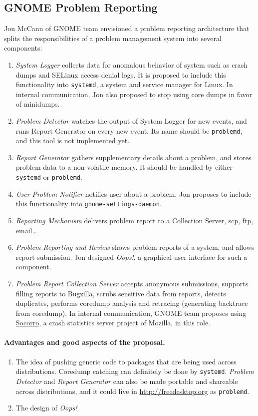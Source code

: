 \documentclass{article}
\begin{document}
\subsection{GNOME Problem Reporting}
Jon McCann of GNOME team envisioned a problem reporting
architecture\cite{JonProposal} that splits the responsibilities of a
problem management system into several components:
\begin{enumerate}
\item \emph{System Logger} collects data for anomalous behavior of
  system such as crash dumps and SELinux access denial logs.  It is
  proposed to include this functionality into \texttt{systemd}, a
  system and service manager for Linux.  In internal communication,
  Jon also proposed to stop using core dumps in favor of minidumps.
\item \emph{Problem Detector} watches the output of System Logger for
  new events, and runs Report Generator on every new event.  Its name
  should be \texttt{problemd}, and this tool is not implemented yet.
\item \emph{Report Generator} gathers supplementary details about a
  problem, and stores problem data to a non-volatile memory.  It
  should be handled by either \texttt{systemd} or \texttt{problemd}.
\item \emph{User Problem Notifier} notifies user about a problem.  Jon
  proposes to include this functionality into
  \texttt{gnome-settings-daemon}.
\item \emph{Reporting Mechanism} delivers problem report to a
  Collection Server, scp, ftp, email\ldots
\item \emph{Problem Reporting and Review} shows problem reports of a
  system, and allows report submission.  Jon designed
  \emph{Oops!}\cite{JonOops}, a graphical user interface for such a
  component.
\item \emph{Problem Report Collection Server} accepts anonymous
  submissions, supports filling reports to Bugzilla, scrubs sensitive
  data from reports, detects duplicates, performs coredump analysis
  and retracing (generating backtrace from coredump).  In internal
  communication, GNOME team proposes using
  \href{https://wiki.mozilla.org/Socorro}{Socorro}, a crash statistics
  server project of Mozilla, in this role.
\end{enumerate}

\paragraph{Advantages and good aspects of the proposal.}
\begin{enumerate}
\item The idea of pushing generic code to packages that are being used
  across distributions.  Coredump catching can definitely be done by
  \texttt{systemd}. \emph{Problem Detector} and \emph{Report
    Generator} can also be made portable and shareable across
  distributions, and it could live in \url{http://freedesktop.org} as
  \texttt{problemd}.
\item The design of \emph{Oops!}.
\end{enumerate}
\end{document}
